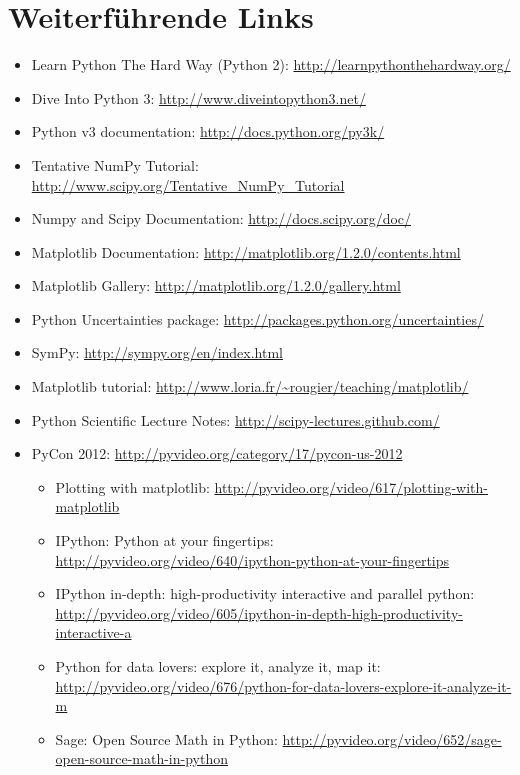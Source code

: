 \section{Weiterführende Links}
\begin{itemize}
  \item Learn Python The Hard Way (Python 2): \url{http://learnpythonthehardway.org/}
  \item Dive Into Python 3: \url{http://www.diveintopython3.net/}
  \item Python v3 documentation: \url{http://docs.python.org/py3k/}
  \item Tentative NumPy Tutorial: \url{http://www.scipy.org/Tentative\_NumPy\_Tutorial}
  \item Numpy and Scipy Documentation: \url{http://docs.scipy.org/doc/}
  \item Matplotlib Documentation: \url{http://matplotlib.org/1.2.0/contents.html}
  \item Matplotlib Gallery: \url{http://matplotlib.org/1.2.0/gallery.html}
  \item Python Uncertainties package: \url{http://packages.python.org/uncertainties/}
  \item SymPy: \url{http://sympy.org/en/index.html}
  \item Matplotlib tutorial: \url{http://www.loria.fr/~rougier/teaching/matplotlib/}
  \item Python Scientific Lecture Notes: \url{http://scipy-lectures.github.com/}
  \item PyCon 2012: \url{http://pyvideo.org/category/17/pycon-us-2012}
    \begin{itemize}
      \item Plotting with matplotlib: \url{http://pyvideo.org/video/617/plotting-with-matplotlib}
      \item IPython: Python at your fingertips: \url{http://pyvideo.org/video/640/ipython-python-at-your-fingertips}
      \item IPython in-depth: high-productivity interactive and parallel python: \url{http://pyvideo.org/video/605/ipython-in-depth-high-productivity-interactive-a}
      \item Python for data lovers: explore it, analyze it, map it: \url{http://pyvideo.org/video/676/python-for-data-lovers-explore-it-analyze-it-m}
      \item Sage: Open Source Math in Python: \url{http://pyvideo.org/video/652/sage-open-source-math-in-python}
    \end{itemize}

\end{itemize}
